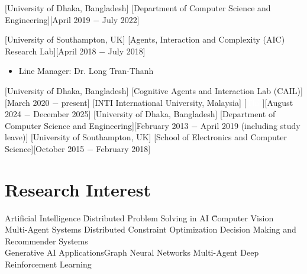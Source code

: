 \documentclass{article}
\begin{document}
[University of Dhaka, Bangladesh]
[Department of Computer Science and Engineering][April 2019 $-$ July 2022]
\vspace{1mm}

[University of Southampton, UK]
[Agents, Interaction and Complexity (AIC) Research Lab][April 2018 $-$ July 2018]
\begin{itemize}
\item Line Manager: Dr. Long Tran-Thanh
\end{itemize}
\vspace{-1mm}
[University of Dhaka, Bangladesh]
[Cognitive Agents and Interaction Lab (CAIL)][March 2020 $-$ present]
\vspace{1mm}
\vspace{-1mm}
[INTI International University, Malaysia]
[\textcolor{white}{This}][August 2024 $-$ December 2025]
[University of Dhaka, Bangladesh]
[Department of Computer Science and Engineering][February 2013 $-$ April 2019 (including study leave)]
\vspace{1mm}
[University of Southampton, UK]
[School of Electronics and Computer Science][October 2015 $-$ February 2018]
\vspace{1mm}

 \section{Research Interest}
 \begin{tabbing}
    Artificial Intelligence\hspace{3.8em} \= Distributed Problem  Solving in AI \hspace{3.8em} \= \=Computer Vision  \\
     Multi-Agent Systems\> Distributed Constraint Optimization  \> Decision Making and Recommender Systems\\Generative AI Applications\>Graph Neural Networks\> Multi-Agent Deep Reinforcement Learning 
\end{tabbing}
\end{document}
